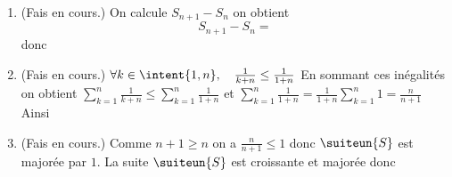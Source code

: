 \documentclass[a4paper, 11pt,reqno]{article}
\begin{document}
%
%
%
%
%
%
%


\begin{correction}
\begin{enumerate}
\item (Fais en cours.) On calcule $S_{n+1}-S_n$ on obtient 
$$S_{n+1}-S_n = $$
donc 
\item (Fais en cours.)
$\forall k\in \intent{1,n}, \quad \frac{1}{k+n}\leq \frac{1}{1+n}$
En sommant ces inégalités on obtient 
$\sum_{k=1}^n \frac{1}{k+n}\leq \sum_{k=1}^n \frac{1}{1+n}$
et $\sum_{k=1}^n \frac{1}{1+n} =\frac{1}{1+n}\sum_{k=1}^n 1 = \frac{n}{n+1}$
Ainsi

\item (Fais en cours.)
Comme $n+1 \geq n$ on a $\frac{n}{n+1}\leq 1$ donc 
$\suiteun{S}$ est majorée par $1$. 
La suite $\suiteun{S}$ est croissante et majorée donc 


\end{enumerate}
\end{correction}
\end{document}

